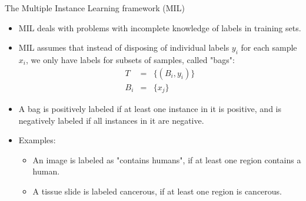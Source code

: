 \documentclass[xcolor=pdftex,dvipsnames,table]{beamer}
\begin{document}
\begin{frame}{The Multiple Instance Learning framework (MIL)}
\begin{itemize}
\item MIL deals with problems with incomplete knowledge of labels in training sets.
\item MIL assumes that instead of disposing of individual labels $y_i$ for each sample $x_i$, we only have labels for subsets of samples, called "bags": 
\begin{eqnarray}
T &=& \{(B_i, y_i)\} \nonumber \\
B_i &=& \{x_j\}
\end{eqnarray}
\item A bag is positively labeled if at least one instance in it is positive, and is negatively labeled if all instances in it are negative.
\item Examples:
\begin{itemize}
   \item An image is labeled as "contains humans", if at least one region contains a human.
   \item A tissue slide is labeled cancerous, if at least one region is cancerous. 
\end{itemize}
\end{itemize}
\end{frame}
\end{document}
